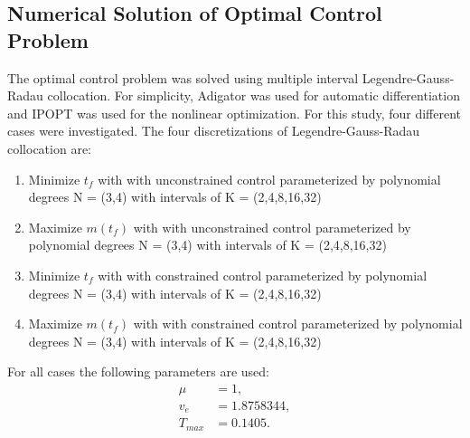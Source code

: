 \documentclass[]{article}
\begin{document}
	\subsection{Numerical Solution of Optimal Control Problem}
	The optimal control problem was solved using multiple interval Legendre-Gauss-Radau collocation. For simplicity, Adigator was used for automatic differentiation and IPOPT was used for the nonlinear optimization. For this study, four different cases were investigated. The four discretizations of Legendre-Gauss-Radau collocation are:
	\begin{enumerate}
		\item Minimize \(t_f\) with with unconstrained control parameterized by polynomial degrees N = (3,4) with intervals of K = (2,4,8,16,32)
		\item Maximize \(m(t_f)\) with with unconstrained control parameterized by polynomial degrees N = (3,4) with intervals of K = (2,4,8,16,32)
		\item Minimize \(t_f\) with with constrained control parameterized by polynomial degrees N = (3,4) with intervals of K = (2,4,8,16,32)
		\item Maximize \(m(t_f)\) with with constrained control parameterized by polynomial degrees N = (3,4) with intervals of K = (2,4,8,16,32)
	\end{enumerate}
	For all cases the following parameters are used:
	\begin{align*}
		\mu &= 1, \\
		v_e &= 1.8758344, \\
        T_{max} &= 0.1405.
	\end{align*}

%     
\end{document}
